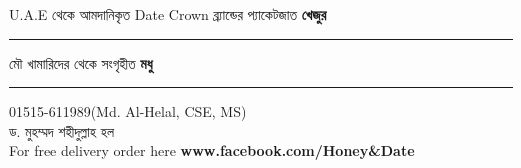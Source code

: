 \documentclass{article}
\begin{document}
\centering
{}
{
{\fontsize{60}{72}\selectfont {}U.A.E থেকে আমদানিকৃত Date Crown ব্র্যান্ডের প্যাকেটজাত \textbf{খেজুর}
\rule{\textwidth}{2pt}
মৌ খামারিদের থেকে সংগৃহীত \textbf{মধু}}
\rule{\textwidth}{2pt}
{\fontsize{36}{43.2}\selectfont {}01515-611989(Md. Al-Helal, CSE, MS)\\ ড. মুহম্মদ শহীদুল্লাহ হল\\} {\fontsize{20}{24} \selectfont {} For free delivery order here \textbf{www.facebook.com/Honey\&Date}}
}
\end{document}
